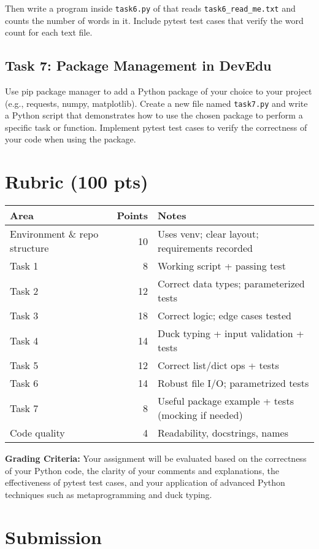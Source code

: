 \documentclass{article}
\begin{document}
Then write a program inside \verb|task6.py| of that reads \verb|task6_read_me.txt| and counts the number of words in it. Include pytest test cases that verify the word count for each text file.

\subsection{Task 7: Package Management in DevEdu}
Use pip package manager to add a Python package of your choice to your project (e.g., requests, numpy, matplotlib). Create a new file named \verb|task7.py| and write a Python script that demonstrates how to use the chosen package to perform a specific task or function. Implement pytest test cases to verify the correctness of your code when using the package.

\section{Rubric (100 pts)}
\begin{center}
\begin{tabular}{l r l}
\hline
\textbf{Area} & \textbf{Points} & \textbf{Notes} \\
\hline
Environment \& repo structure & 10 & Uses venv; clear layout; requirements recorded \\
Task 1 & 8 & Working script + passing test \\
Task 2 & 12 & Correct data types; parameterized tests \\
Task 3 & 18 & Correct logic; edge cases tested \\
Task 4 & 14 & Duck typing + input validation + tests \\
Task 5 & 12 & Correct list/dict ops + tests \\
Task 6 & 14 & Robust file I/O; parametrized tests \\
Task 7 & 8 & Useful package example + tests (mocking if needed) \\
Code quality & 4 & Readability, docstrings, names \\
\hline
\end{tabular}
\end{center}
\textbf{Grading Criteria:} Your assignment will be evaluated based on the correctness of your Python code, the clarity of your comments and explanations, the effectiveness of pytest test cases, and your application of advanced Python techniques such as metaprogramming and duck typing.


\section{Submission}
\end{document}

